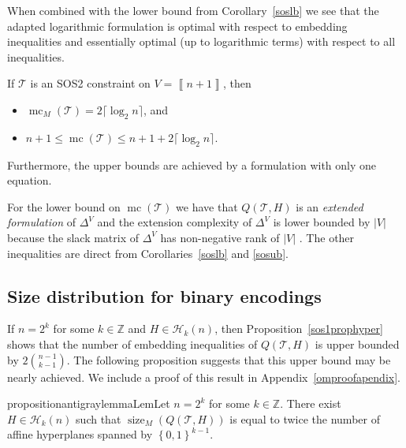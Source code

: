 \documentclass[mnsc]{informs3}
\newcommand{\set}[1]{\left\{#1\right\}}                     %
\newcommand{\abs}[1]{\left|#1\right|}                       %
\newcommand{\bra}[1]{\left(#1\right)}
\newcommand{\sidx}[1]{\left\llbracket     #1 \right\rrbracket}
\newcommand{\Int}{\mathbb Z}
\DeclareMathOperator{\size}{size}
\DeclareMathOperator{\mmc}{mc}
\begin{document}
When combined with the lower bound from Corollary~\ref{soslb} we see that the adapted logarithmic formulation is optimal with respect to embedding inequalities and essentially optimal (up to logarithmic terms) with respect to all inequalities. 

\begin{corollary}\label{sosboundcoro}If $\mathcal{T}$  is an SOS2 constraint on  $V=\sidx{n+1}$, then
\begin{itemize}
\item $\mmc_M\bra{\mathcal{T}}=2\lceil \log_2 n\rceil$, and
\item  $n+1\leq \mmc\bra{\mathcal{T}}\leq n+1 +2\lceil \log_2 n\rceil$.
\end{itemize}
Furthermore, the upper bounds are achieved by a formulation with only one equation.
\end{corollary}
For the lower bound on $\mmc\bra{\mathcal{T}}$ we have that $Q\bra{\mathcal{T},H}$ is an \emph{extended formulation} of $\Delta^V$ and the extension complexity of $\Delta^V$ is lower bounded by $\abs{V}$ because the slack matrix of $\Delta^V$ has non-negative rank of $\abs{V}$ \citep{Kaibel11}. The other inequalities are direct from Corollaries~\ref{soslb} and \ref{sosub}. 
\Halmos\endproof

  
\subsection{Size distribution for binary encodings}\label{graphsec}

If $n=2^k$ for some $k\in \Int$ and $H\in \mathcal{H}_{k}(n)$, then Proposition~\ref{sos1prophyper} shows that the  number of embedding inequalities of $Q\bra{\mathcal{T},H}$ is upper bounded by $2 \binom{n-1}{k-1}$. The following proposition suggests that this upper bound may be nearly achieved. We include a proof of this result in Appendix~\ref{omproofapendix}.

\begin{restatable}{proposition}{antigraylemmaLem}\label{antigraylemma}Let $n=2^k$ for some $k\in \Int$. There exist $H\in \mathcal{H}_{k}(n)$ such that $\size_M\bra{Q\bra{\mathcal{T},H}}$ is equal to twice the number of affine hyperplanes spanned by $\set{0,1}^{k-1}$.
\end{restatable}
\end{document}
